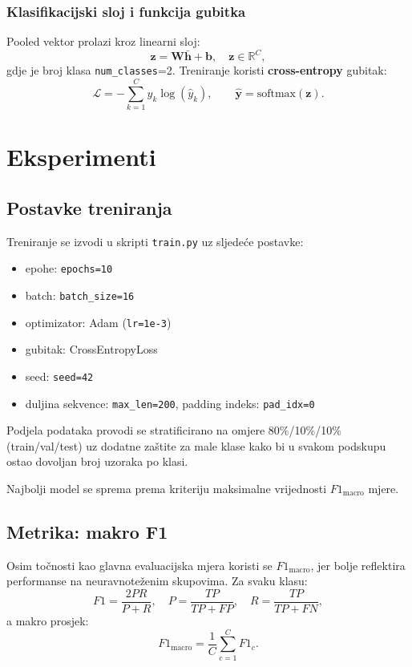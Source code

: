 \documentclass[12pt,a4paper]{article}
\begin{document}
\subsubsection{Klasifikacijski sloj i funkcija gubitka}
Pooled vektor prolazi kroz linearni sloj:
\[
\mathbf{z}=\mathbf{W}\bar{\mathbf{h}}+\mathbf{b}, \quad \mathbf{z}\in\mathbb{R}^{C},
\]
gdje je broj klasa \texttt{num\_classes}=2. Treniranje koristi \textbf{cross-entropy} gubitak:
\[
\mathcal{L}=-\sum_{k=1}^{C} y_k\log(\hat{y}_k),
\qquad \hat{\mathbf{y}}=\mathrm{softmax}(\mathbf{z}).
\]

\section{Eksperimenti}

\subsection{Postavke treniranja}
Treniranje se izvodi u skripti \texttt{train.py} uz sljedeće postavke:
\begin{itemize}
  \item epohe: \texttt{epochs=10}
  \item batch: \texttt{batch\_size=16}
  \item optimizator: Adam (\texttt{lr=1e-3})
  \item gubitak: CrossEntropyLoss
  \item seed: \texttt{seed=42}
  \item duljina sekvence: \texttt{max\_len=200}, padding indeks: \texttt{pad\_idx=0}
\end{itemize}

Podjela podataka provodi se stratificirano na omjere 80\%/10\%/10\% (train/val/test) uz
dodatne zaštite za male klase kako bi u svakom podskupu ostao dovoljan broj uzoraka po klasi.

Najbolji model se sprema prema kriteriju maksimalne vrijednosti $F1_{\mathrm{macro}}$ mjere.


\subsection{Metrika: makro F1}
Osim točnosti kao glavna evaluacijska mjera koristi se $F1_{\mathrm{macro}}$, jer bolje reflektira performanse na neuravnoteženim
skupovima. Za svaku klasu:
\[
F1=\frac{2PR}{P+R},\quad
P=\frac{TP}{TP+FP},\quad
R=\frac{TP}{TP+FN},
\]
a makro prosjek:
\[
F1_{\mathrm{macro}}=\frac{1}{C}\sum_{c=1}^{C}F1_c.
\]
\end{document}
